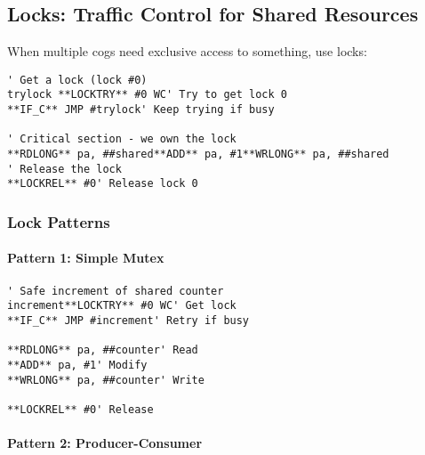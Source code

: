 \documentclass[11pt]{book}
\begin{document}
\hypertarget{locks-traffic-control-for-shared-resources}{%
\subsection{Locks: Traffic Control for Shared
Resources}\label{locks-traffic-control-for-shared-resources}}

When multiple cogs need exclusive access to something, use locks:

\begin{lstlisting}
' Get a lock (lock #0)
trylock **LOCKTRY** #0 WC' Try to get lock 0
**IF_C** JMP #trylock' Keep trying if busy

' Critical section - we own the lock
**RDLONG** pa, ##shared**ADD** pa, #1**WRLONG** pa, ##shared        
' Release the lock
**LOCKREL** #0' Release lock 0
\end{lstlisting}

\hypertarget{lock-patterns}{%
\subsubsection{Lock Patterns}\label{lock-patterns}}

\hypertarget{pattern-1-simple-mutex}{%
\paragraph{Pattern 1: Simple Mutex}\label{pattern-1-simple-mutex}}

\begin{lstlisting}
' Safe increment of shared counter
increment**LOCKTRY** #0 WC' Get lock
**IF_C** JMP #increment' Retry if busy
        
**RDLONG** pa, ##counter' Read
**ADD** pa, #1' Modify
**WRLONG** pa, ##counter' Write
        
**LOCKREL** #0' Release
\end{lstlisting}

\hypertarget{pattern-2-producer-consumer}{%
\paragraph{Pattern 2:
Producer-Consumer}\label{pattern-2-producer-consumer}}
\end{document}

